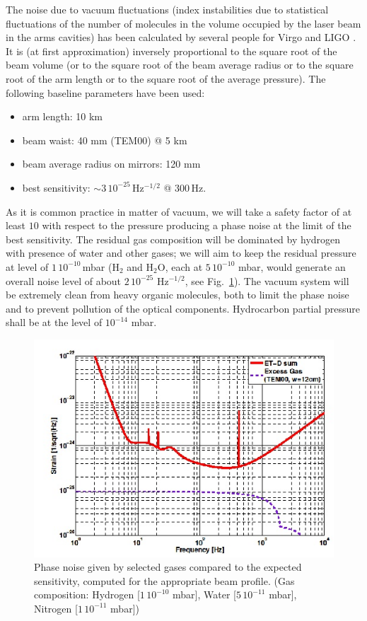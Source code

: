 The noise due to vacuum fluctuations (index instabilities due to statistical fluctuations of the number of molecules in the volume occupied by the laser beam in the arms cavities) has been calculated by several people for Virgo and LIGO \cite{cella08}. It is (at first approximation) inversely proportional to the square root of the beam volume (or to the square root of the beam average radius or to the square root of the arm length or to the square root of the average pressure).
The following baseline parameters have been used:
\begin{itemize}
\item arm length:  					10 km
\item beam waist:  					40 mm (TEM00) @ 5 km
\item beam average radius on mirrors: 		120 mm
\item best sensitivity:  				$\sim 3\,10^{-25}$\,Hz$^{-1/2}$ @ 300\,Hz.
\end{itemize}


As it is common practice in matter of vacuum, we will take a safety factor of at least $10$ with respect to the pressure producing a phase noise at the limit of the best sensitivity. The residual gas composition will be dominated by hydrogen with presence of water and other gases; we will aim to keep the residual pressure at level of $1\,10^{-10}$\,mbar (H$_2$ and H$_2$O, each at $5\,10^{-10}$ mbar, would generate an overall noise level of about $2\,10^{-25}$ Hz$^{-1/2}$, see Fig.~\ref{fig:vac3}). The vacuum system will be extremely clean from heavy organic molecules, both to limit the phase noise and to prevent pollution of the optical components. Hydrocarbon partial pressure shall be at the level of $10^{-14}$ mbar.

\begin{figure}
\begin{center}
\includegraphics{Sec_SiteInfra/Figures/VAC3.jpg}
\caption{Phase noise given by selected gases compared to the expected sensitivity, computed for the appropriate beam profile. (Gas composition: Hydrogen [$1\,10^{-10}$ mbar], Water [$5\,10^{-11}$ mbar], Nitrogen [$1\,10^{-11}$ mbar])}
\label{fig:vac3}
\end{center}
\end{figure}


